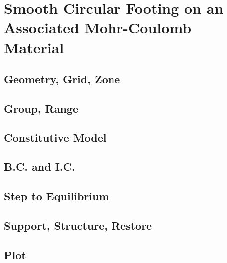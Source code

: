 \documentclass[a4paper, nobind]{templates/ociamthesis}
\newcommand*{\bibtitle}{Works Cited}
\begin{document}
\hypertarget{smooth-circular-footing-on-an-associated-mohr-coulomb-material}{%
\chapter{Smooth Circular Footing on an Associated Mohr-Coulomb Material}\label{smooth-circular-footing-on-an-associated-mohr-coulomb-material}}

\hypertarget{geometry-grid-zone-3}{%
\section{Geometry, Grid, Zone}\label{geometry-grid-zone-3}}

\hypertarget{group-range-3}{%
\section{Group, Range}\label{group-range-3}}

\hypertarget{constitutive-model-3}{%
\section{Constitutive Model}\label{constitutive-model-3}}

\hypertarget{b.c.-and-i.c.-3}{%
\section{B.C. and I.C.}\label{b.c.-and-i.c.-3}}

\hypertarget{step-to-equilibrium-3}{%
\section{Step to Equilibrium}\label{step-to-equilibrium-3}}

\hypertarget{support-structure-restore-3}{%
\section{Support, Structure, Restore}\label{support-structure-restore-3}}

\hypertarget{plot-3}{%
\section{Plot}\label{plot-3}}


\setlength{\baselineskip}{0pt} %

{\renewcommand*\MakeUppercase[1]{#1}%
\printbibliography[heading=bibintoc,title={\bibtitle}]}
\end{document}
